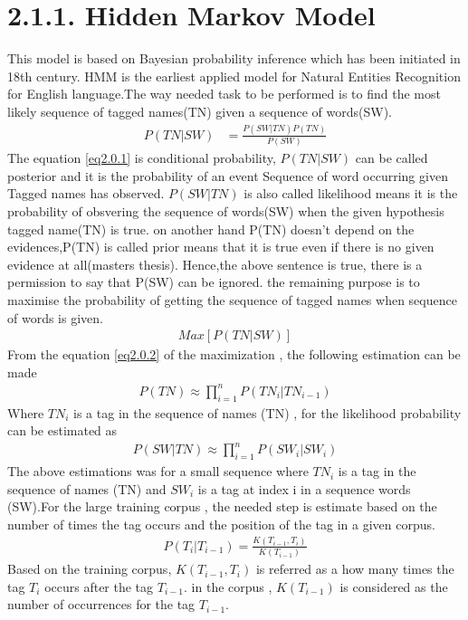 \section*{2.1.1. Hidden Markov Model}
This model is based on Bayesian probability inference which has been initiated in 18th century. HMM is the earliest applied model for Natural Entities Recognition for English language.The way needed task to be performed is to find the most likely sequence of tagged names(TN) given a sequence of words(SW).
\begin{align}
P(TN|SW) & = \frac{P(SW|TN)P(TN)}{P(SW)}\label{eq2.0.1}
\end{align}
The equation  \eqref{eq2.0.1} is conditional probability, $P(TN|SW)$ can be  called posterior and it is  the probability of an event Sequence of word occurring given Tagged names has observed. 
$P(SW|TN)$ is also called likelihood means it is the probability of obsvering the sequence of words(SW) when the given hypothesis tagged name(TN) is true. on another hand P(TN) doesn't depend on the evidences,P(TN) is called prior means that it is true even if there is no given evidence at all(masters thesis).
Hence,the above sentence is true, there is a permission to say  that P(SW) can be ignored. the remaining purpose is to maximise the probability of getting the sequence of tagged names when sequence of words is given.
\begin{align}
Max\left[P(TN|SW)\right] \label{eq2.0.2}
\end{align}
From the equation  \eqref{eq2.0.2} of the maximization , the following estimation can be made
\begin{align}
P(TN){\approx} \prod_{i=1}^{n} P({TN}_{i}|{TN}_{i-1}) \label{2.0.3}
\end{align}
Where ${TN}_{i}$ is a tag in the sequence of names (TN) , for the likelihood probability can be estimated as 
\begin{align}
P(SW|TN){\approx} \prod_{i=1}^{n} P({SW}_{i}|{SW}_{i})\label{2.0.4}
\end{align}
The above estimations was for a small sequence where ${TN}_{i}$ is a tag in the sequence of names (TN) and ${SW}_{i}$ is a tag at index i in a sequence words (SW).For the large training corpus , the needed step is estimate based on the number of times the tag occurs and the position of the tag in a given corpus.
\begin{align}
P(T_{i}|T_{i-1}) = \frac{K(T_{i-1},T_{i})}{K(T_{i-1})}\label{2.0.5}
\end{align}
Based on the training corpus, $K(T_{i-1},T_{i})$ is referred as a how many times the tag $T_{i}$ occurs after the tag $T_{i-1}$. in the corpus , $K(T_{i-1})$ is considered as the number of occurrences for the tag $T_{i-1}$.

